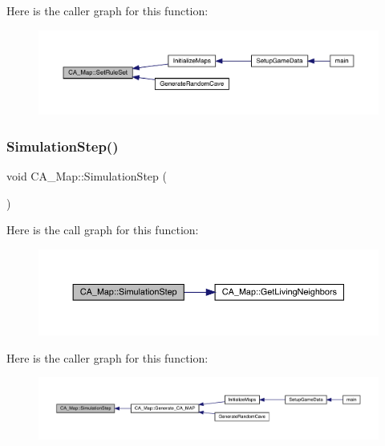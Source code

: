 Here is the caller graph for this function\+:
\nopagebreak
\begin{figure}[H]
\begin{center}
\leavevmode
\includegraphics[width=350pt]{class_c_a___map_a5d22c84ef623d63d99300d1f83af143e_icgraph}
\end{center}
\end{figure}
\mbox{\label{class_c_a___map_a9f978dd06a224ab2acf97f1c532ec3da}} 
\subsubsection{\texorpdfstring{Simulation\+Step()}{SimulationStep()}}
{\footnotesize\ttfamily void C\+A\+\_\+\+Map\+::\+Simulation\+Step (\begin{DoxyParamCaption}{ }\end{DoxyParamCaption})}

Here is the call graph for this function\+:
\nopagebreak
\begin{figure}[H]
\begin{center}
\leavevmode
\includegraphics[width=350pt]{class_c_a___map_a9f978dd06a224ab2acf97f1c532ec3da_cgraph}
\end{center}
\end{figure}
Here is the caller graph for this function\+:
\nopagebreak
\begin{figure}[H]
\begin{center}
\leavevmode
\includegraphics[width=350pt]{class_c_a___map_a9f978dd06a224ab2acf97f1c532ec3da_icgraph}
\end{center}
\end{figure}
\mbox{\label{class_c_a___map_a7a3a75540c418bdcee3689ecfca4cbff}} 
